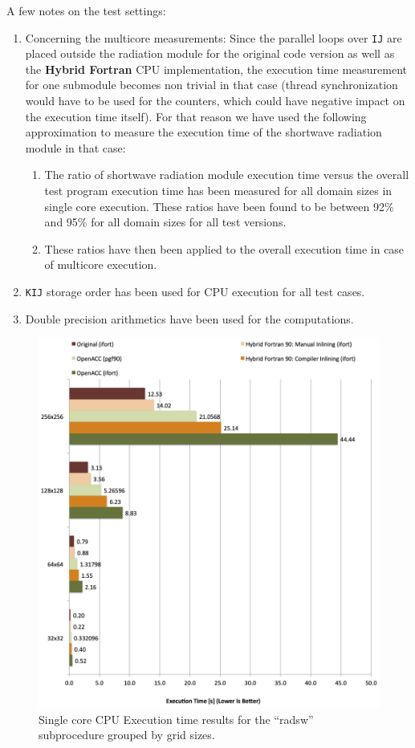 A few notes on the test settings: 
\begin{enumerate}
 \item Concerning the multicore measurements: Since the parallel loops over \verb|IJ| are placed outside the radiation module for the original code version as well as the \textbf{Hybrid Fortran} CPU implementation, the execution time measurement for one submodule becomes non trivial in that case (thread synchronization would have to be used for the counters, which could have negative impact on the execution time itself). For that reason we have used the following approximation to measure the execution time of the shortwave radiation module in that case: 
  \begin{enumerate}
  \item The ratio of shortwave radiation module execution time versus the overall test program execution time has been measured for all domain sizes in single core execution. These ratios have been found to be between 92\% and 95\% for all domain sizes for all test versions.
  \item These ratios have then been applied to the overall execution time in case of multicore execution.
  \end{enumerate}
 \item \verb|KIJ| storage order has been used for CPU execution for all test cases.
 \item Double precision arithmetics have been used for the computations.
\end{enumerate}

\begin{figure}[htpb]
        \centering
        \includegraphics[width=14cm]{figures/verificationCPU1CoreExecTime}
        \caption[Single Core CPU Execution Time Results of Sample Implementation]{Single core CPU Execution time results for the ``radsw'' subprocedure grouped by grid sizes.}
        \label{figure:verificationCPU1CoreExecTime}
\end{figure}

